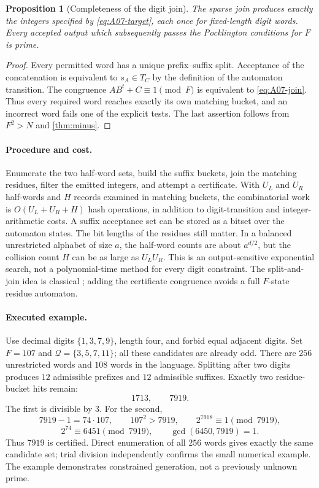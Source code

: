 \documentclass[11pt,a4paper]{article}
\newtheorem{proposition}[theorem]{Proposition}
\theoremstyle{definition}\newtheorem{definition}[theorem]{Definition}
\theoremstyle{remark}\newtheorem{remark}[theorem]{Remark}
\begin{document}
\begin{proposition}[Completeness of the digit join]\label{prop:A07}
The sparse join produces exactly the integers specified by
\eqref{eq:A07-target}, each once for fixed-length digit words.
Every accepted output which subsequently passes the Pocklington conditions
for $F$ is prime.
\end{proposition}
\begin{proof}
Every permitted word has a unique prefix--suffix split. Acceptance of the
concatenation is equivalent to $s_A\in T_C$ by the definition of the
automaton transition. The congruence $AB^t+C\equiv1\pmod F$ is equivalent to
\eqref{eq:A07-join}. Thus every required word reaches exactly its own
matching bucket, and an incorrect word fails one of the explicit tests.
The last assertion follows from $F^2>N$ and \cref{thm:minus}.
\end{proof}

\paragraph{Procedure and cost.}
Enumerate the two half-word sets, build the suffix buckets, join the
matching residues, filter the emitted integers, and attempt a certificate.
With $U_L$ and $U_R$ half-words and $H$ records examined in matching buckets,
the combinatorial work is $O(U_L+U_R+H)$ hash operations, in addition to
digit-transition and integer-arithmetic costs. A suffix acceptance set can
be stored as a bitset over the automaton states. The bit lengths of the
residues still matter. In a balanced unrestricted alphabet of size $a$,
the half-word counts are about $a^{d/2}$, but the collision count $H$ can
be as large as $U_LU_R$. This is an output-sensitive exponential search,
not a polynomial-time method for every digit constraint. The split-and-join
idea is classical \cite{arith-hs}; adding the certificate congruence avoids
a full $F$-state residue automaton.

\paragraph{Executed example.}
Use decimal digits $\{1,3,7,9\}$, length four, and forbid equal adjacent
digits. Set $F=107$ and $\mathcal Q=\{3,5,7,11\}$; all these candidates
are already odd. There are $256$ unrestricted words and $108$ words in the
language. Splitting after two digits produces $12$ admissible prefixes and
$12$ admissible suffixes. Exactly two residue-bucket hits remain:
\[
 1713,\qquad7919.
\]
The first is divisible by $3$. For the second,
\[
 7919-1=74\cdot107,\qquad107^2>7919,\qquad
 2^{7918}\equiv1\pmod{7919},
\]
\[
 2^{74}\equiv6451\pmod{7919},\qquad\gcd(6450,7919)=1.
\]
Thus $7919$ is certified. Direct enumeration of all $256$ words gives
exactly the same candidate set; trial division independently confirms the
small numerical example. The example demonstrates constrained generation,
not a previously unknown prime.
\end{document}
